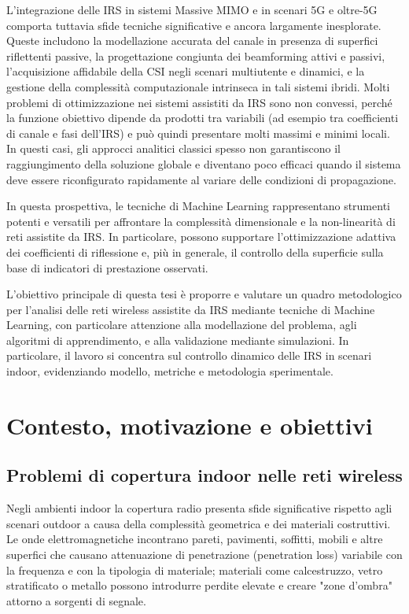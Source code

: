 \documentclass[12pt,a4paper]{report}
\begin{document}
L'integrazione delle IRS in sistemi Massive MIMO e in scenari 5G e
oltre-5G comporta tuttavia sfide tecniche significative e ancora
largamente inesplorate. Queste includono la modellazione accurata del
canale in presenza di superfici riflettenti passive, la progettazione
congiunta dei beamforming attivi e passivi, l'acquisizione affidabile
della CSI negli scenari multiutente e dinamici, e la gestione della
complessità computazionale intrinseca in tali sistemi ibridi.
Molti problemi di ottimizzazione nei sistemi assistiti da IRS sono
non convessi, perché la funzione obiettivo dipende da prodotti tra
variabili (ad esempio tra coefficienti di canale e fasi dell'IRS) e
può quindi presentare molti massimi e minimi locali. In questi casi,
gli approcci analitici classici spesso non garantiscono il
raggiungimento della soluzione globale e diventano poco efficaci
quando il sistema deve essere riconfigurato rapidamente al variare
delle condizioni di propagazione.

In questa prospettiva, le tecniche di Machine Learning rappresentano
strumenti potenti e versatili per affrontare la complessità
dimensionale e la non-linearità di reti assistite da IRS. In
particolare, possono supportare l'ottimizzazione adattiva dei
coefficienti di riflessione e, più in generale, il controllo della
superficie sulla base di indicatori di prestazione osservati.

L'obiettivo principale di questa tesi è proporre e valutare un
quadro metodologico per l'analisi delle reti wireless assistite da
IRS mediante tecniche di Machine Learning, con particolare attenzione
alla modellazione del problema, agli algoritmi di apprendimento, e
alla validazione mediante simulazioni. In particolare, il lavoro si
concentra sul controllo dinamico delle IRS in scenari indoor,
evidenziando modello, metriche e metodologia sperimentale.

\tableofcontents

\cleardoublepage
{}
\setcounter{page}{1}

\chapter{Contesto, motivazione e obiettivi}
\label{chap:contesto}

\section{Problemi di copertura indoor nelle reti wireless}
Negli ambienti indoor la copertura radio presenta sfide significative
rispetto agli scenari outdoor a causa della complessità geometrica e
dei materiali costruttivi. Le onde elettromagnetiche incontrano
pareti, pavimenti, soffitti, mobili e altre superfici che causano
attenuazione di penetrazione (penetration loss) variabile con la
frequenza e con la tipologia di materiale; materiali come
calcestruzzo, vetro stratificato o metallo possono introdurre perdite
elevate e creare "zone d'ombra" attorno a sorgenti di segnale.
\end{document}
